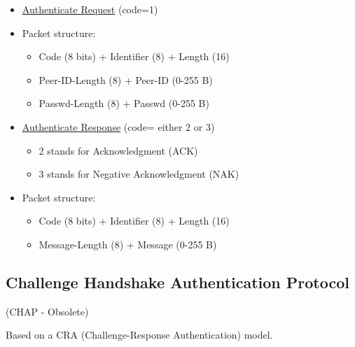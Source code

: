\begin{tcolorbox}[colback=yellow!10!white, colframe=yellow!70!black, title=Peer \textrightarrow Authenticator] 
    
    \begin{itemize}
        \item \underline{Authenticate Request} (code=1)
        \item Packet structure:
        \begin{itemize}
            \item Code (8 bits) + Identifier (8) + Length (16)
            \item Peer-ID-Length (8) + Peer-ID (0-255 B)
            \item Passwd-Length (8) + Passwd (0-255 B)
        \end{itemize}
    \end{itemize}
\end{tcolorbox}

\begin{tcolorbox}[colback=yellow!10!white, colframe=yellow!70!black, title=Authenticator \textrightarrow Peer] 
    
    \begin{itemize}
        \item \underline{Authenticate Response} (code= either 2 or 3)
        \begin{itemize}
            \item 2 stands for Acknowledgment (ACK)
            \item 3 stands for Negative Acknowledgment (NAK)
        \end{itemize}
        \item Packet structure:
        \begin{itemize}
            \item Code (8 bits) + Identifier (8) + Length (16)
            \item Message-Length (8) + Message (0-255 B)
        \end{itemize}
    \end{itemize}
\end{tcolorbox}


\subsection{Challenge Handshake Authentication Protocol}
\begin{center}
    (CHAP - Obsolete)

    Based on a CRA (Challenge-Response Authentication) model.
\end{center}

